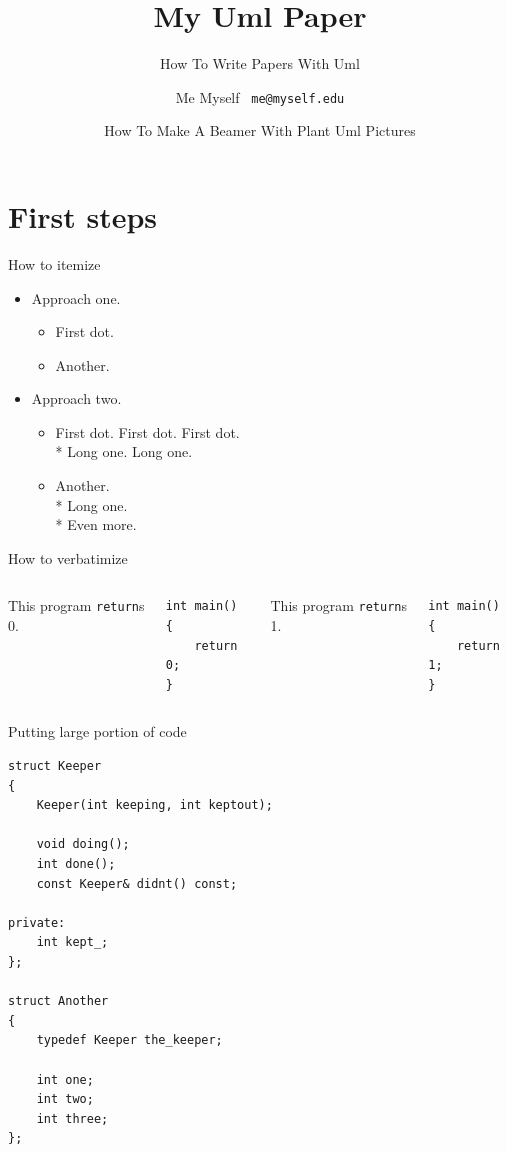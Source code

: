 \documentclass{beamer}
\title{My Uml Paper}
\subtitle{How To Write Papers With Uml}
\author[Me]{Me Myself \ \texttt{me@myself.edu}}
\date[UML2015]{How To Make A Beamer With Plant Uml Pictures}
\begin{document}
\begin{frame}
  \titlepage
\end{frame}

\begin{frame}
  \tableofcontents
\end{frame}

\section{First steps}

\begin{frame}{How to itemize}
      \begin{itemize}
          \item Approach one.
          \begin{itemize}
            \item First dot.
            \item Another.
        \end{itemize}
          \item Approach two.
          \begin{itemize}
            \item First dot. First dot. First dot.
                  \\* Long one. Long one.
            \item Another.
                  \\* Long one.
                  \\* Even more.
        \end{itemize}
    \end{itemize}
\end{frame}

\begin{frame}[fragile]{How to verbatimize}
    \begin{columns}
            This program \texttt{return}s 0.
\begin{verbatim}
int main()
{
    return 0;
}
\end{verbatim}
            This program \texttt{return}s 1.
\begin{verbatim}
int main()
{
    return 1;
}
\end{verbatim}
    \end{columns}
\end{frame}

\begin{frame}[fragile]{Putting large portion of code}
\tiny
\begin{verbatim}
struct Keeper
{
    Keeper(int keeping, int keptout);

    void doing();
    int done();
    const Keeper& didnt() const;

private:
    int kept_;
};

struct Another
{
    typedef Keeper the_keeper;

    int one;
    int two;
    int three;
};
\end{verbatim}
\end{frame}
\end{document}
